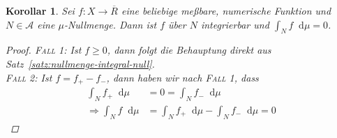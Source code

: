 \documentclass[11pt, twoside, a4paper]{article}
\theoremstyle{plain}
\newtheorem{korollar}[blockelement]{Korollar}
\numberwithin{equation}{subsection}
\newcommand{\impl}[0]{\Rightarrow{}}
\newcommand{\dif}{\mathop{}\!\mathrm{d}}
\newcommand{\mA}{\mathcal{A}}
\begin{document}
    \begin{korollar}
        Sei $f: X \to\overline{R}$ eine beliebige meßbare, numerische Funktion und $N\in\mA$ eine $\mu$-Nullmenge. Dann ist $f$ über $N$ integrierbar und $ \int_{N}^{} f \dif \mu = 0$.

        \begin{proof}
            \textsc{Fall 1}: Ist $f\geq 0$, dann folgt die Behauptung direkt aus Satz~\ref{satz:nullmenge-integral-null}.\\
            \textsc{Fall 2}: Ist $f = f_+ - f_-$, dann haben wir nach \textsc{Fall 1}, dass
            \begin{align*}
                \int_{N}^{} f_+ \dif \mu &= 0 = \int_{N}^{} f_- \dif \mu\\
                \impl \int_{N}^{} f \dif \mu &= \int_{N}^{} f_+ \dif \mu - \int_{N}^{} f_- \dif \mu = 0
            \end{align*}
        \end{proof}
    \end{korollar}
\end{document}
